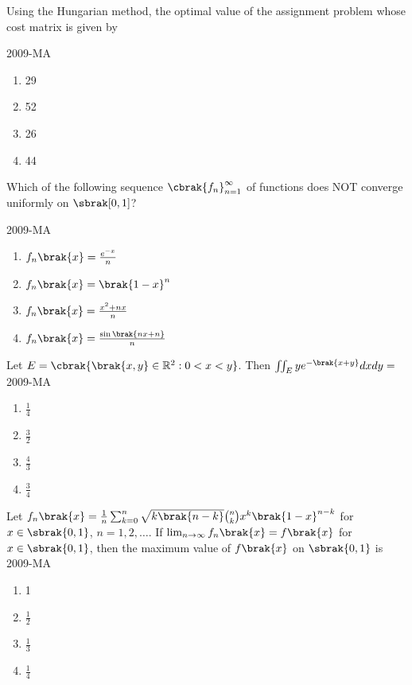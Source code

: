 	\item Using the Hungarian method, the optimal value of the assignment problem whose cost matrix is given by 
		\begin{table}[ht]
		\centering
		
		\end{table}
\hfill{2009-MA}
	\begin{multicols}{4}
	\begin{enumerate}
		\item 29
		\item 52
		\item 26
		\item 44
	\end{enumerate}
	\end{multicols}

	\item Which of the following sequence $\cbrak{f_{n}}_{n=1}^{\infty}$ of functions does NOT converge uniformly on $\sbrak[0,1]$?

		\hfill{2009-MA}
	\begin{multicols}{2}
	\begin{enumerate}
		\item $f_{n}\brak{x}=\frac{e^{-x}}{n}$
		\item $f_{n}\brak{x}=\brak{1-x}^{n}$
		\item $f_{n}\brak{x}=\frac{x^{2}+nx}{n}$
		\item $f_{n}\brak{x}=\frac{\sin\brak{nx+n}}{n}$
	\end{enumerate}
	\end{multicols}

	\item Let $E=\cbrak{\brak{x,y}\in \mathbb{R}^{2} : 0<x<y}$. Then $\iint_{E} ye^{-\brak{x+y}}dxdy=$
\hfill{2009-MA}
	\begin{multicols}{2}
	\begin{enumerate}
		\item $\frac{1}{4}$
		\item $\frac{3}{2}$
		\item $\frac{4}{3}$
		\item $\frac{3}{4}$
	\end{enumerate}
	\end{multicols}

	\item Let $f_{n}\brak{x}=\frac{1}{n} \sum _{k=0}^{n} \sqrt{k\brak{n-k}} \binom{n}{k} x^{k} \brak{1-x}^{n-k}$ for $x\in \sbrak{0,1}$, $n=1, 2, \dots$. If $\lim _{n\to \infty} f_{n}\brak{x}=f\brak{x}$ for $x\in \sbrak{0,1}$, then the maximum value of $f\brak{x}$ on $\sbrak{0,1}$ is
\hfill{2009-MA}
	\begin{multicols}{4}
	\begin{enumerate}
		\item 1
		\item $\frac{1}{2}$
		\item $\frac{1}{3}$
		\item $\frac{1}{4}$
	\end{enumerate}
	\end{multicols}

